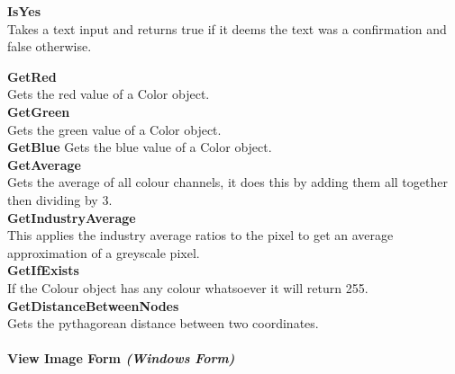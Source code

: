 \begin{FlushLeft}
    \textbf{IsYes} \\ \bk
    Takes a text input and returns true if it deems the text was a confirmation and false otherwise.\\\bk

    \textbf{GetRed} \\ \bk
    Gets the red value of a Color object.\\\bk
    \textbf{GetGreen} \\ \bk
    Gets the green value of a Color object.\\\bk
    \textbf{GetBlue}
    Gets the blue value of a Color object.\\\bk
    \textbf{GetAverage} \\ \bk
    Gets the average of all colour channels, it does this by adding them all together then dividing by 3.\\\bk
    \textbf{GetIndustryAverage} \\ \bk
    This applies the industry average ratios to the pixel to get an average approximation of a greyscale pixel.\\\bk
    \textbf{GetIfExists} \\ \bk
    If the Colour object has any colour whatsoever it will return 255.\\\bk
    \textbf{GetDistanceBetweenNodes} \\ \bk
    Gets the pythagorean distance between two coordinates.\\

    \bk

    \pagebreak
\paragraph{View Image Form \textit{(Windows Form)}} \mbox{} \\

    \begin{figure}[H]
        \centering
    \end{figure}\\


\end{FlushLeft}

